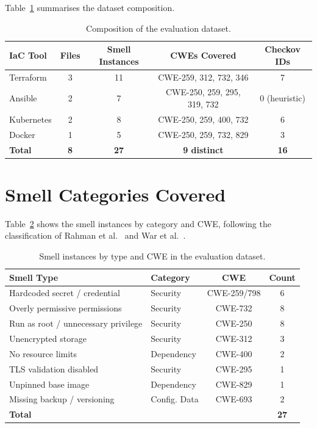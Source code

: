 \documentclass[12pt, a4paper]{report}
\begin{document}
Table~\ref{tab:dataset_stats} summarises the dataset composition.

\begin{table}[H]
  \centering
  \caption{Composition of the evaluation dataset.}
  \label{tab:dataset_stats}
  \small
  \begin{tabular}{lcccc}
    \toprule
    \textbf{IaC Tool} & \textbf{Files} & \textbf{Smell Instances} &
    \textbf{CWEs Covered} & \textbf{Checkov IDs} \\
    \midrule
    Terraform   & 3 & 11 & CWE-259, 312, 732, 346 & 7 \\
    Ansible     & 2 & 7  & CWE-250, 259, 295, 319, 732 & 0 (heuristic) \\
    Kubernetes  & 2 & 8  & CWE-250, 259, 400, 732 & 6 \\
    Docker      & 1 & 5  & CWE-250, 259, 732, 829 & 3 \\
    \midrule
    \textbf{Total} & \textbf{8} & \textbf{27} & \textbf{9 distinct} & \textbf{16} \\
    \bottomrule
  \end{tabular}
\end{table}

\section{Smell Categories Covered}

Table~\ref{tab:smell_categories} shows the smell instances by category and CWE,
following the classification of Rahman et al.~\citep{rahman2019seven} and
War et al.~\citep{war2025taxonomy}.

\begin{table}[H]
  \centering
  \caption{Smell instances by type and CWE in the evaluation dataset.}
  \label{tab:smell_categories}
  \begin{tabular}{llcc}
    \toprule
    \textbf{Smell Type} & \textbf{Category} & \textbf{CWE} & \textbf{Count} \\
    \midrule
    Hardcoded secret / credential & Security & CWE-259/798 & 6 \\
    Overly permissive permissions & Security & CWE-732 & 8 \\
    Run as root / unnecessary privilege & Security & CWE-250 & 8 \\
    Unencrypted storage & Security & CWE-312 & 3 \\
    No resource limits & Dependency & CWE-400 & 2 \\
    TLS validation disabled & Security & CWE-295 & 1 \\
    Unpinned base image & Dependency & CWE-829 & 1 \\
    Missing backup / versioning & Config. Data & CWE-693 & 2 \\
    \midrule
    \textbf{Total} & & & \textbf{27} \\
    \bottomrule
  \end{tabular}
\end{table}
\end{document}

